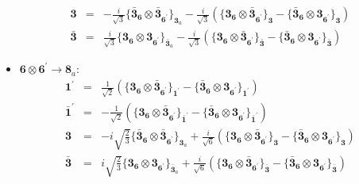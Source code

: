 \documentclass[english]{article}
\newcommand{\subcg}[3]{\big\{ {#1}\otimes{#2}\big\}^{}_{#3}}
\newcommand{\rep}[1]{\mathbf{#1}}
\begin{document}
\begin{itemize}
\begin{eqnarray*}
\rep{3} &=& -\frac{i}{\sqrt{3}}\subcg{\rep{\bar{3}}_{\rep{6}}}{\rep{\bar{3}}_{\rep{6^{\prime}}}}{\rep{3}_{a}}-\frac{i}{\sqrt{3}}\left(\subcg{\rep{3}_{\rep{6}}}{\rep{\bar{3}}_{\rep{6^{\prime}}}}{\rep{3}}-\subcg{\rep{\bar{3}}_{\rep{6}}}{\rep{3}_{\rep{6^{\prime}}}}{\rep{3}}\right)
\\
\rep{\bar{3}} &=& \frac{i}{\sqrt{3}}\subcg{\rep{3}_{\rep{6}}}{\rep{3}_{\rep{6^{\prime}}}}{\rep{\bar{3}}_{a}}-\frac{i}{\sqrt{3}}\left(\subcg{\rep{3}_{\rep{6}}}{\rep{\bar{3}}_{\rep{6^{\prime}}}}{\rep{\bar{3}}}-\subcg{\rep{\bar{3}}_{\rep{6}}}{\rep{3}_{\rep{6^{\prime}}}}{\rep{\bar{3}}}\right)
\end{eqnarray*}
\item $\rep{6}\otimes\rep{6^{\prime}}\to\rep{8}_{a}$:
\begin{eqnarray*}
\rep{1^{\prime}} &=& \frac{1}{\sqrt{2}}\left(\subcg{\rep{3}_{\rep{6}}}{\rep{\bar{3}}_{\rep{6^{\prime}}}}{\rep{1^{\prime}}}-\subcg{\rep{\bar{3}}_{\rep{6}}}{\rep{3}_{\rep{6^{\prime}}}}{\rep{1^{\prime}}}\right)
\\
\rep{\bar{1}^{\prime}} &=& -\frac{1}{\sqrt{2}}\left(\subcg{\rep{3}_{\rep{6}}}{\rep{\bar{3}}_{\rep{6^{\prime}}}}{\rep{\bar{1}^{\prime}}}-\subcg{\rep{\bar{3}}_{\rep{6}}}{\rep{3}_{\rep{6^{\prime}}}}{\rep{\bar{1}^{\prime}}}\right)
\\
\rep{3} &=& -i \sqrt{\frac{2}{3}}\subcg{\rep{\bar{3}}_{\rep{6}}}{\rep{\bar{3}}_{\rep{6^{\prime}}}}{\rep{3}_{a}}+\frac{i}{\sqrt{6}}\left(\subcg{\rep{3}_{\rep{6}}}{\rep{\bar{3}}_{\rep{6^{\prime}}}}{\rep{3}}-\subcg{\rep{\bar{3}}_{\rep{6}}}{\rep{3}_{\rep{6^{\prime}}}}{\rep{3}}\right)
\\
\rep{\bar{3}} &=& i \sqrt{\frac{2}{3}}\subcg{\rep{3}_{\rep{6}}}{\rep{3}_{\rep{6^{\prime}}}}{\rep{\bar{3}}_{a}}+\frac{i}{\sqrt{6}}\left(\subcg{\rep{3}_{\rep{6}}}{\rep{\bar{3}}_{\rep{6^{\prime}}}}{\rep{\bar{3}}}-\subcg{\rep{\bar{3}}_{\rep{6}}}{\rep{3}_{\rep{6^{\prime}}}}{\rep{\bar{3}}}\right)
\end{eqnarray*}
\end{itemize}
\end{document}
